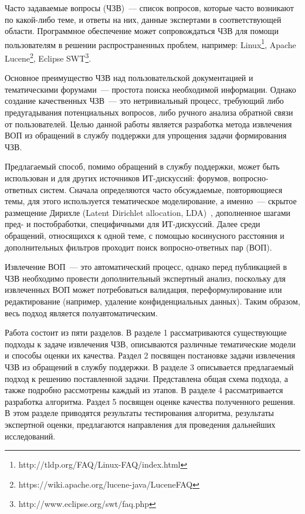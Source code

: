 \intro

Часто задаваемые вопросы (ЧЗВ)~--- список вопросов, которые часто возникают по какой-либо теме, и ответы на них, данные экспертами в соответствующей области. Программное обеспечение может сопровождаться ЧЗВ для помощи пользователям в решении распространенных проблем, например: Linux\footnote{http://tldp.org/FAQ/Linux-FAQ/index.html}, Apache Lucene\footnote{https://wiki.apache.org/lucene-java/LuceneFAQ}, Eclipse SWT\footnote{http://www.eclipse.org/swt/faq.php}.

Основное преимущество ЧЗВ над пользовательской документацией и тематическими форумами~--- простота поиска необходимой информации. Однако создание качественных ЧЗВ~--- это нетривиальный процесс, требующий либо предугадывания потенциальных вопросов, либо ручного анализа обратной связи от пользователей. Целью данной работы является разработка метода извлечения ВОП из обращений в службу поддержки для упрощения задачи формирования ЧЗВ.

Предлагаемый способ, помимо обращений в службу поддержки, может быть использован и для других источников ИТ-дискуссий: форумов, вопросно-ответных систем. Сначала определяются часто обсуждаемые, повторяющиеся темы, для этого используется тематическое моделирование, а именно~--- скрытое размещение Дирихле (Latent Dirichlet allocation, LDA)~\cite{LDA}, дополненное шагами пред- и постобработки, специфичными для ИТ-дискуссий. Далее среди обращений, относящихся к одной теме, с помощью косинусного расстояния и дополнительных фильтров проходит поиск вопросно-ответных пар (ВОП). 


Извлечение ВОП~--- это автоматический процесс, однако перед публикацией в ЧЗВ необходимо провести дополнительный экспертный анализ, поскольку для извлеченных ВОП может потребоваться валидация, переформулирование или редактирование (например, удаление конфиденциальных данных). Таким образом, весь подход является полуавтоматическим. 

Работа состоит из пяти разделов. В разделе 1 рассматриваются существующие подходы к задаче извлечения ЧЗВ, описываются различные тематические модели и способы оценки их качества. Раздел 2 посвящен постановке задачи извлечения ЧЗВ из обращений в службу поддержки. В разделе 3 описывается предлагаемый подход к решению поставленной задачи. Представлена общая схема подхода, а также подробно рассмотрены каждый из этапов. В разделе 4 рассматривается разработка алгоритма. Раздел 5 посвящен оценке качества полученного решения. В этом разделе приводятся результаты тестирования алгоритма, результаты экспертной оценки, предлагаются направления для проведения дальнейших исследований.